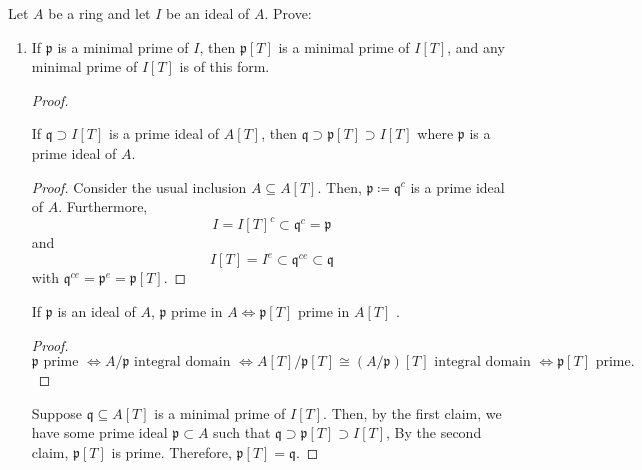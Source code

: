 \begin{problem}
    Let $A$ be a ring and let $I$ be an ideal of $A$.
    Prove:
    \begin{enumerate}[label=(\theproblem.\arabic*),ref=\theproblem.\arabic*]

        \item If $\mathfrak{p}$ is a minimal prime of $I$, then $\mathfrak{p}[T]$ is a minimal prime of $I[T]$, and any minimal prime of $I[T]$ is of this form.
        \begin{sol}

            \begin{proof}

                \begin{claim}
                    If $\mathfrak{q} \supset I[T]$ is a prime ideal of $A[T]$, then
                    $\mathfrak{q} \supset \mathfrak{p}[T] \supset I[T]$ where $\mathfrak{p}$ is a prime ideal of $A$.
                     \begin{proof}
                        Consider the usual inclusion $A \subseteq A[T]$.
                        Then,
                        $\mathfrak{p} \coloneqq \mathfrak{q}^{c}$ is a prime ideal of $A$.
                        Furthermore,
                        \[I = I[T]^c \subset \mathfrak{q}^c = \mathfrak{p}\]
                        and
                        \[I[T] = I^e \subset \mathfrak{q}^{ce} \subset \mathfrak{q}\]
                        with $\mathfrak{q}^{ce}=\mathfrak{p}^e = \mathfrak{p}[T]$.
                     \end{proof}
                \end{claim}

                \begin{claim}
                    If $\mathfrak{p}$ is an ideal of $A$, $\mathfrak{p}$ prime in $A \Leftrightarrow \mathfrak{p}[T]$ prime in $A[T]$ .
                    \begin{proof}
                        $\mathfrak{p} \text{ prime } \Leftrightarrow
                        A / \mathfrak{p} \text{ integral domain }
                        \Leftrightarrow A[T]/\mathfrak{p}[T] \cong (A / \mathfrak{p})[T] \text{ integral domain }
                        \Leftrightarrow \mathfrak{p}[T] \text{ prime.}$
                    \end{proof}
                \end{claim}



                Suppose $\mathfrak{q} \subseteq A[T]$ is a minimal prime of $I[T]$.
                Then, by the first claim, we have some prime ideal $\mathfrak{p} \subset A$ such that
                $\mathfrak{q} \supset \mathfrak{p}[T] \supset I[T]$,
                By the second claim, $\mathfrak{p}[T]$ is prime.
                Therefore, $\mathfrak{p}[T] = \mathfrak{q}$.


\end{proof}
\end{sol}
\end{enumerate}
\end{problem}
